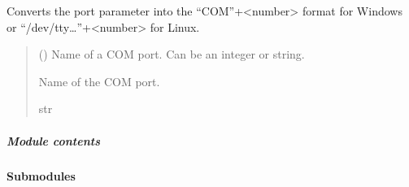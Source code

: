 \documentclass[letterpaper,10pt,english]{sphinxmanual}
\begin{document}
\begin{fulllineitems}
\begin{fulllineitems}
\end{fulllineitems}


\begin{fulllineitems}
\label{\detokenize{PodApi.Devices.SerialPorts:PodApi.Devices.SerialPorts.SerialComm.PortIO.__BuildPortName}}
\pysigstartsignatures
{}
\pysigstopsignatures
\sphinxAtStartPar
Converts the port parameter into the “COM”+\textless{}number\textgreater{} format for Windows or         “/dev/tty…”+\textless{}number\textgreater{} for Linux.
\begin{quote}\begin{description}
\sphinxAtStartPar
{} (\sphinxstyleliteralemphasis{\sphinxupquote{ | }}) \textendash{} Name of a COM port. Can be an integer or string.

\sphinxAtStartPar
Name of the COM port.

\sphinxAtStartPar
str

\end{description}\end{quote}

\end{fulllineitems}


\end{fulllineitems}



\subparagraph{Module contents}
\label{\detokenize{PodApi.Devices.SerialPorts:module-PodApi.Devices.SerialPorts}}\label{\detokenize{PodApi.Devices.SerialPorts:module-contents}}

\paragraph{Submodules}
\label{\detokenize{PodApi.Devices:submodules}}
\end{document}
